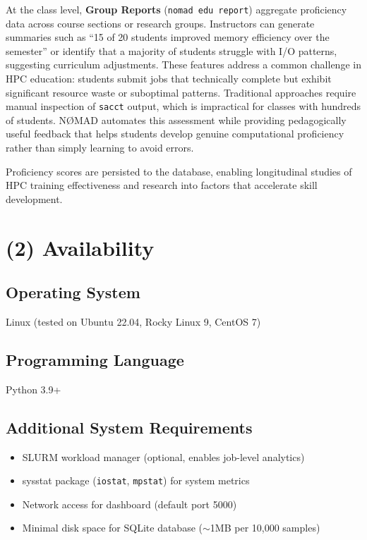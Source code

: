 \documentclass[11pt,a4paper]{article}
\begin{document}
At the class level, \textbf{Group Reports} (\texttt{nomad edu report}) aggregate proficiency data across course sections or research groups. Instructors can generate summaries such as ``15 of 20 students improved memory efficiency over the semester'' or identify that a majority of students struggle with I/O patterns, suggesting curriculum adjustments. These features address a common challenge in HPC education: students submit jobs that technically complete but exhibit significant resource waste or suboptimal patterns. Traditional approaches require manual inspection of \texttt{sacct} output, which is impractical for classes with hundreds of students. NØMAD automates this assessment while providing pedagogically useful
feedback that helps students develop genuine computational proficiency rather than simply learning to avoid errors.

Proficiency scores are persisted to the database, enabling longitudinal studies of HPC training effectiveness and research into factors that accelerate skill development.

\section*{(2) Availability}

\subsection*{Operating System}
Linux (tested on Ubuntu 22.04, Rocky Linux 9, CentOS 7)

\subsection*{Programming Language}
Python 3.9+

\subsection*{Additional System Requirements}
\begin{itemize}
\item SLURM workload manager (optional, enables job-level analytics)
\item sysstat package (\texttt{iostat}, \texttt{mpstat}) for system metrics
\item Network access for dashboard (default port 5000)
\item Minimal disk space for SQLite database ($\sim$1MB per 10,000 samples)
\end{itemize}
\end{document}
